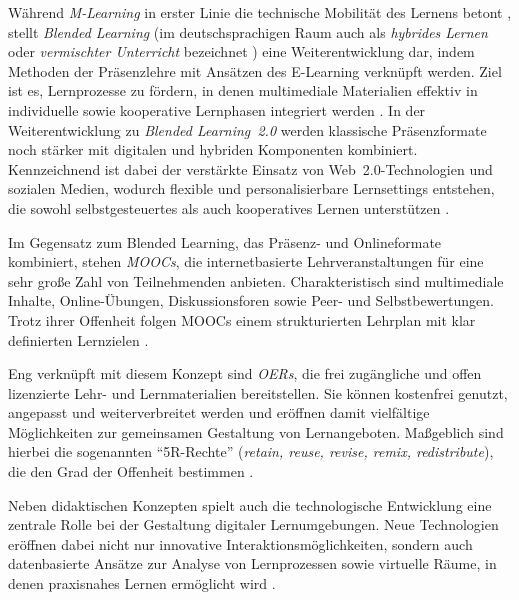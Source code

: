 Während \textit{M-Learning} in erster Linie die technische Mobilität des Lernens betont \parencites[S.~3f]{balaji_perspective_2016}[S.~197]{basak_kumar_e-learning_2018}, stellt \textit{Blended Learning} (im deutschsprachigen Raum auch als \textit{hybrides Lernen} oder \textit{vermischter Unterricht} bezeichnet \parencite[S.~29]{pfeiffer_simulationsumgebungen_2008}) eine Weiterentwicklung dar, indem Methoden der Präsenzlehre mit Ansätzen des E-Learning verknüpft werden. Ziel ist es, Lernprozesse zu fördern, in denen multimediale Materialien effektiv in individuelle sowie kooperative Lernphasen integriert werden \parencite[S.~74]{magenheim_blended_2003}. In der Weiterentwicklung zu \textit{Blended Learning~2.0} werden klassische Präsenzformate noch stärker mit digitalen und hybriden Komponenten kombiniert. Kennzeichnend ist dabei der verstärkte Einsatz von Web~2.0-Technologien und sozialen Medien, wodurch flexible und personalisierbare Lernsettings entstehen, die sowohl selbstgesteuertes als auch kooperatives Lernen unterstützen \parencites{seufert_schulleitertagung_2014}{news_aktuell_gmbh_e-learning_2025}.

Im Gegensatz zum Blended Learning, das Präsenz- und Onlineformate kombiniert, stehen \textit{\acp{MOOC}}, die internetbasierte Lehrveranstaltungen für eine sehr große Zahl von Teilnehmenden anbieten. Charakteristisch sind multimediale Inhalte, Online-Übungen, Diskussionsforen sowie Peer- und Selbstbewertungen. Trotz ihrer Offenheit folgen MOOCs einem strukturierten Lehrplan mit klar definierten Lernzielen \parencites[S.~5]{yuan_moocs_2013}[S.~204]{liyanagunawardena_moocs_2013}.

Eng verknüpft mit diesem Konzept sind \textit{\acp{OER}}, die frei zugängliche und offen lizenzierte Lehr- und Lernmaterialien bereitstellen. Sie können kostenfrei genutzt, angepasst und weiterverbreitet werden und eröffnen damit vielfältige Möglichkeiten zur gemeinsamen Gestaltung von Lernangeboten. Maßgeblich sind hierbei die sogenannten \enquote{5R-Rechte} (\textit{retain, reuse, revise, remix, redistribute}), die den Grad der Offenheit bestimmen \parencite[S.~134f]{wiley_defining_2018}.


Neben didaktischen Konzepten spielt auch die technologische Entwicklung eine zentrale Rolle bei der Gestaltung digitaler Lernumgebungen. Neue Technologien eröffnen dabei nicht nur innovative Interaktionsmöglichkeiten, sondern auch datenbasierte Ansätze zur Analyse von Lernprozessen sowie virtuelle Räume, in denen praxisnahes Lernen ermöglicht wird \parencite[S.1]{celik_technology_2024}.

